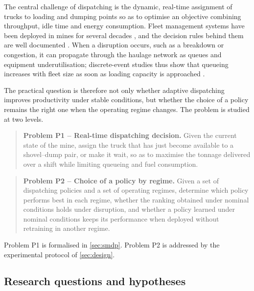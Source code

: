 \documentclass[11pt,a4paper]{article}
\newif\ifrevmarks
\newcommand{\revtag}[1]{\ifrevmarks\textsuperscript{\textcolor{red!70!black}{\scriptsize[#1]}}\fi}
\newenvironment{revbloc}[1]{\par\ifrevmarks\color{revcolor}\noindent\revtag{#1}\ \fi}{\par}
\begin{document}
\begin{revbloc}{M24}
The central challenge of dispatching is the dynamic, real-time assignment of trucks to loading and dumping points so as to optimise an objective combining throughput, idle time and energy consumption. Fleet management systems have been deployed in mines for several decades \cite{Afrapoli2017, AlexandraNewman2010}, and the decision rules behind them are well documented \cite{MohanMunirathinam1994, Alarie2002}. When a disruption occurs, such as a breakdown or congestion, it can propagate through the haulage network as queues and equipment underutilisation; discrete-event studies thus show that queueing increases with fleet size as soon as loading capacity is approached \cite{Zeng2022, NecmettinCetin2004}.

The practical question is therefore not only whether adaptive dispatching improves productivity under stable conditions, but whether the choice of a policy remains the right one when the operating regime changes. The problem is studied at two levels.

\begin{quote}
\textbf{Problem P1 -- Real-time dispatching decision.}
Given the current state of the mine, assign the truck that has just become available to a shovel--dump pair, or make it wait, so as to maximise the tonnage delivered over a shift while limiting queueing and fuel consumption.
\end{quote}

\begin{quote}
\textbf{Problem P2 -- Choice of a policy by regime.}
Given a set of dispatching policies and a set of operating regimes, determine which policy performs best in each regime, whether the ranking obtained under nominal conditions holds under disruption, and whether a policy learned under nominal conditions keeps its performance when deployed without retraining in another regime.
\end{quote}

Problem P1 is formalised in \cref{sec:smdp}. Problem P2 is addressed by the experimental protocol of \cref{sec:design}.
\end{revbloc}

\subsection{Research questions and hypotheses}
\label{sec:rq}
\end{document}

